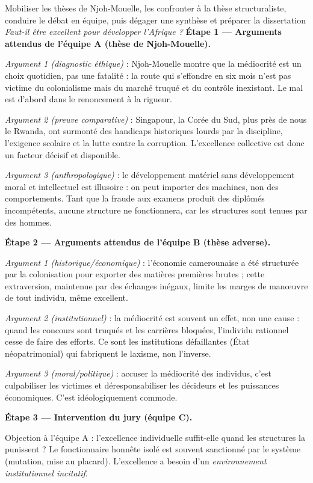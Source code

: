 \documentclass[11pt]{article}
\begin{document}
\begin{exoresolu}
Mobiliser les thèses de Njoh-Mouelle, les confronter à la thèse structuraliste, conduire le débat en équipe, puis dégager une synthèse et préparer la dissertation \emph{Faut-il être excellent pour développer l'Afrique ?}
\tcblower
\textbf{Étape 1 — Arguments attendus de l'équipe A (thèse de Njoh-Mouelle).}

\emph{Argument 1 (diagnostic éthique)} : Njoh-Mouelle montre que la médiocrité est un choix quotidien, pas une fatalité : la route qui s'effondre en six mois n'est pas victime du colonialisme mais du marché truqué et du contrôle inexistant. Le mal est d'abord dans le renoncement à la rigueur.

\emph{Argument 2 (preuve comparative)} : Singapour, la Corée du Sud, plus près de nous le Rwanda, ont surmonté des handicaps historiques lourds par la discipline, l'exigence scolaire et la lutte contre la corruption. L'excellence collective est donc un facteur décisif et disponible.

\emph{Argument 3 (anthropologique)} : le développement matériel sans développement moral et intellectuel est illusoire : on peut importer des machines, non des comportements. Tant que la fraude aux examens produit des diplômés incompétents, aucune structure ne fonctionnera, car les structures sont tenues par des hommes.

\textbf{Étape 2 — Arguments attendus de l'équipe B (thèse adverse).}

\emph{Argument 1 (historique/économique)} : l'économie camerounaise a été structurée par la colonisation pour exporter des matières premières brutes ; cette extraversion, maintenue par des échanges inégaux, limite les marges de manœuvre de tout individu, même excellent.

\emph{Argument 2 (institutionnel)} : la médiocrité est souvent un effet, non une cause : quand les concours sont truqués et les carrières bloquées, l'individu rationnel cesse de faire des efforts. Ce sont les institutions défaillantes (État néopatrimonial) qui fabriquent le laxisme, non l'inverse.

\emph{Argument 3 (moral/politique)} : accuser la médiocrité des individus, c'est culpabiliser les victimes et déresponsabiliser les décideurs et les puissances économiques. C'est idéologiquement commode.

\textbf{Étape 3 — Intervention du jury (équipe C).}

Objection à l'équipe A : l'excellence individuelle suffit-elle quand les structures la punissent ? Le fonctionnaire honnête isolé est souvent sanctionné par le système (mutation, mise au placard). L'excellence a besoin d'un \emph{environnement institutionnel incitatif}.


\end{exoresolu}
\end{document}
